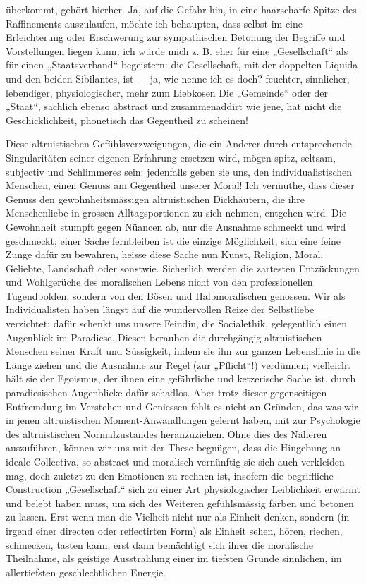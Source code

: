 überkommt, gehört hierher. Ja, auf die Gefahr hin, in eine haarscharfe Spitze des Raffinements auszulaufen, möchte ich behaupten, dass selbst im  eine Erleichterung oder Erschwerung zur sympathischen Betonung der Begriffe und Vorstellungen liegen kann; ich würde mich z. B. eher für eine „Gesellschaft“ als für einen „Staatsverband“ begeistern: die Gesellschaft, mit der doppelten Liquida und den beiden Sibilantes, ist — ja, wie nenne ich es doch? feuchter, sinnlicher, lebendiger, physiologischer, mehr zum Liebkosen  Die „Gemeinde“ oder der „Staat“, sachlich ebenso abstract und zusammenaddirt wie jene, hat nicht die Geschicklichkeit, phonetisch das Gegentheil zu scheinen!
\par

Diese altruistischen Gefühlsverzweigungen, die ein Anderer durch entsprechende Singularitäten seiner eigenen Erfahrung ersetzen wird, mögen spitz, seltsam, subjectiv und Schlimmeres sein: jedenfalls geben sie uns, den individualistischen Menschen, einen Genuss am Gegentheil unserer Moral! Ich vermuthe, dass dieser Genuss den gewohnheitsmässigen altruistischen Dickhäutern, die ihre Menschenliebe in grossen Alltagsportionen zu sich nehmen, entgehen wird. Die Gewohnheit stumpft gegen Nüancen ab, nur die Ausnahme schmeckt und wird geschmeckt; einer Sache fernbleiben ist die einzige Möglichkeit, sich eine feine Zunge dafür zu bewahren, heisse diese Sache nun Kunst, Religion, Moral, Geliebte, Landschaft oder sonstwie. Sicherlich werden die zartesten Entzückungen und Wohlgerüche des moralischen Lebens nicht von den professionellen Tugendbolden, sondern von den Bösen und Halbmoralischen genossen. Wir als Individualisten haben längst auf die wundervollen Reize der Selbstliebe verzichtet; dafür schenkt uns unsere Feindin, die Socialethik, gelegentlich einen Augenblick im Paradiese. Diesen berauben die durchgängig altruistischen Menschen seiner Kraft und Süssigkeit, indem sie ihn zur ganzen Lebenslinie in die Länge ziehen und die Ausnahme zur Regel (zur „Pflicht“!) verdünnen; vielleicht hält sie der Egoismus, der ihnen eine gefährliche und ketzerische Sache ist, durch  paradiesischen Augenblicke dafür schadlos. Aber trotz dieser gegenseitigen Entfremdung im Verstehen und Geniessen fehlt es nicht an Gründen, das was wir in jenen altruistischen Moment-Anwandlungen gelernt haben, mit zur Psychologie des altruistischen Normalzustandes heranzuziehen. Ohne dies des Näheren auszuführen, können wir uns mit der These begnügen, dass die Hingebung an ideale Collectiva, so abstract und moralisch-vernünftig sie sich auch verkleiden mag, doch zuletzt zu den  Emotionen zu rechnen ist, insofern die begriffliche Construction „Gesellschaft“ sich zu einer Art physiologischer Leiblichkeit erwärmt und belebt haben muss, um sich des Weiteren gefühlsmässig färben und betonen zu lassen. Erst wenn man die Vielheit nicht nur als Einheit denken, sondern (in irgend einer directen oder reflectirten Form) als Einheit sehen, hören, riechen, schmecken, tasten kann, erst dann bemächtigt sich ihrer die moralische Theilnahme, als geistige Ausstrahlung einer im tiefsten Grunde sinnlichen, im allertiefsten geschlechtlichen Energie.
\par

